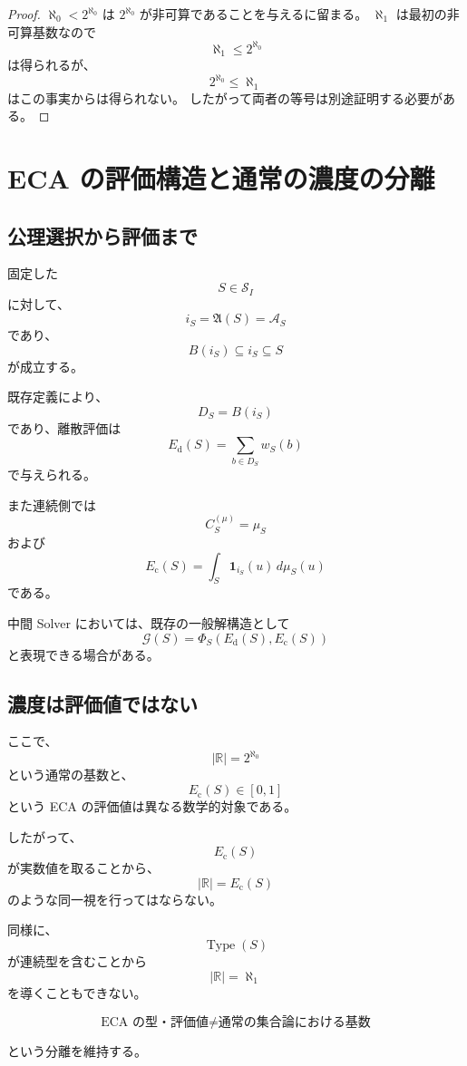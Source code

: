 \documentclass[a4paper,11pt]{article}
\newcommand{\Aset}{\mathcal{A}}
\newcommand{\R}{\mathbb{R}}
\begin{document}
\begin{proof}
$\aleph_0<2^{\aleph_0}$ は $2^{\aleph_0}$ が非可算であることを与えるに留まる。
$\aleph_1$ は最初の非可算基数なので
\[
\aleph_1\leq2^{\aleph_0}
\]
は得られるが、
\[
2^{\aleph_0}\leq\aleph_1
\]
はこの事実からは得られない。
したがって両者の等号は別途証明する必要がある。
\end{proof}

\section{ECA の評価構造と通常の濃度の分離}

\subsection{公理選択から評価まで}

固定した
\[
S\in\mathcal{S}_I
\]
に対して、
\[
i_S=\mathfrak A(S)=\Aset_S
\]
であり、
\[
B(i_S)\subseteq i_S\subseteq S
\]
が成立する。

既存定義により、
\[
D_S=B(i_S)
\]
であり、離散評価は
\[
E_{\mathrm{d}}(S)
=
\sum_{b\in D_S}w_S(b)
\]
で与えられる。

また連続側では
\[
C_S^{(\mu)}=\mu_S
\]
および
\[
E_{\mathrm c}(S)
=
\int_S\mathbf 1_{i_S}(u)\,d\mu_S(u)
\]
である。

中間 Solver においては、既存の一般解構造として
\[
\mathcal G(S)
=
\Phi_S
\left(
E_{\mathrm{d}}(S),
E_{\mathrm c}(S)
\right)
\]
と表現できる場合がある。

\subsection{濃度は評価値ではない}

ここで、
\[
|\R|=2^{\aleph_0}
\]
という通常の基数と、
\[
E_{\mathrm c}(S)\in[0,1]
\]
という ECA の評価値は異なる数学的対象である。

したがって、
\[
E_{\mathrm c}(S)
\]
が実数値を取ることから、
\[
|\R|=E_{\mathrm c}(S)
\]
のような同一視を行ってはならない。

同様に、
\[
\operatorname{Type}(S)
\]
が連続型を含むことから
\[
|\R|=\aleph_1
\]
を導くこともできない。

\[
\boxed{
\text{ECA の型・評価値}
\neq
\text{通常の集合論における基数}
}
\]

という分離を維持する。
\end{document}
